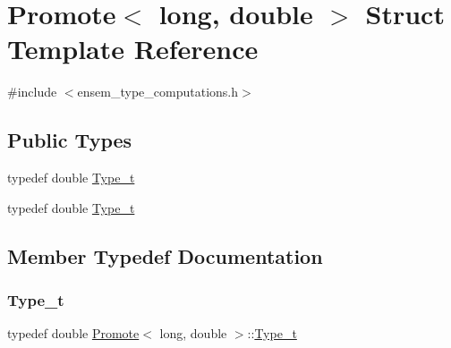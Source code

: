\hypertarget{structPromote_3_01long_00_01double_01_4}{}\section{Promote$<$ long, double $>$ Struct Template Reference}
\label{structPromote_3_01long_00_01double_01_4}


{\ttfamily \#include $<$ensem\+\_\+type\+\_\+computations.\+h$>$}

\subsection*{Public Types}
\begin{DoxyCompactItemize}
\item 
typedef double \mbox{\hyperlink{structPromote_3_01long_00_01double_01_4_aab2bb863f5db06bd92f7818e53d06867}{Type\+\_\+t}}
\item 
typedef double \mbox{\hyperlink{structPromote_3_01long_00_01double_01_4_aab2bb863f5db06bd92f7818e53d06867}{Type\+\_\+t}}
\end{DoxyCompactItemize}


\subsection{Member Typedef Documentation}
\mbox{\label{structPromote_3_01long_00_01double_01_4_aab2bb863f5db06bd92f7818e53d06867}} 
\subsubsection{\texorpdfstring{Type\_t}{Type\_t}\hspace{0.1cm}{\footnotesize\ttfamily [1/2]}}
{\footnotesize\ttfamily typedef double \mbox{\hyperlink{structPromote}{Promote}}$<$ long, double $>$\+::\mbox{\hyperlink{structPromote_3_01long_00_01double_01_4_aab2bb863f5db06bd92f7818e53d06867}{Type\+\_\+t}}}

\mbox{\label{structPromote_3_01long_00_01double_01_4_aab2bb863f5db06bd92f7818e53d06867}} 
